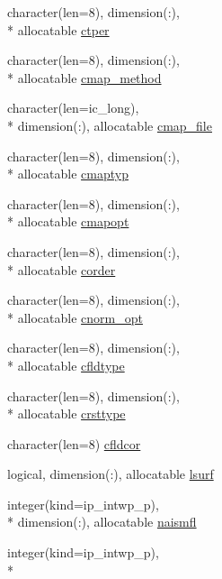 \begin{DoxyCompactItemize}
\item 
character(len=8), dimension(\+:), \\*
allocatable \hyperlink{classmod__oasis__namcouple_aa179b0a473551b48ef895497515d021c}{ctper}
\item 
character(len=8), dimension(\+:), \\*
allocatable \hyperlink{classmod__oasis__namcouple_ac8c1f0014f2c3cbe0cc4fcb09e54dde3}{cmap\+\_\+method}
\item 
character(len=ic\+\_\+long), \\*
dimension(\+:), allocatable \hyperlink{classmod__oasis__namcouple_a6dbd7bccbfa28b209a4bc58131f8cf11}{cmap\+\_\+file}
\item 
character(len=8), dimension(\+:), \\*
allocatable \hyperlink{classmod__oasis__namcouple_a82b32aa4c78713443daf65a3dfbc75dc}{cmaptyp}
\item 
character(len=8), dimension(\+:), \\*
allocatable \hyperlink{classmod__oasis__namcouple_a3d7b34ed13d4ad8f86bbab3ad9956b6b}{cmapopt}
\item 
character(len=8), dimension(\+:), \\*
allocatable \hyperlink{classmod__oasis__namcouple_a070f65b97986d1075f1deed9224cd89b}{corder}
\item 
character(len=8), dimension(\+:), \\*
allocatable \hyperlink{classmod__oasis__namcouple_a205e8ba5863c6bf6de5c8450fb060c7a}{cnorm\+\_\+opt}
\item 
character(len=8), dimension(\+:), \\*
allocatable \hyperlink{classmod__oasis__namcouple_af6d77b87036aa40faa1ae1ed1b2a0866}{cfldtype}
\item 
character(len=8), dimension(\+:), \\*
allocatable \hyperlink{classmod__oasis__namcouple_a7cbf27327f01748c4f87803ccff71b61}{crsttype}
\item 
character(len=8) \hyperlink{classmod__oasis__namcouple_a5e1d0d9b3d9f438102623d9643fbc704}{cfldcor}
\item 
logical, dimension(\+:), allocatable \hyperlink{classmod__oasis__namcouple_a902fe007f6c2505858bf72dbc64e43a2}{lsurf}
\item 
integer(kind=ip\+\_\+intwp\+\_\+p), \\*
dimension(\+:), allocatable \hyperlink{classmod__oasis__namcouple_a4a7cad8814c7811b364fd7d70b60b576}{naismfl}
\item 
integer(kind=ip\+\_\+intwp\+\_\+p), \\*

\end{DoxyCompactItemize}
